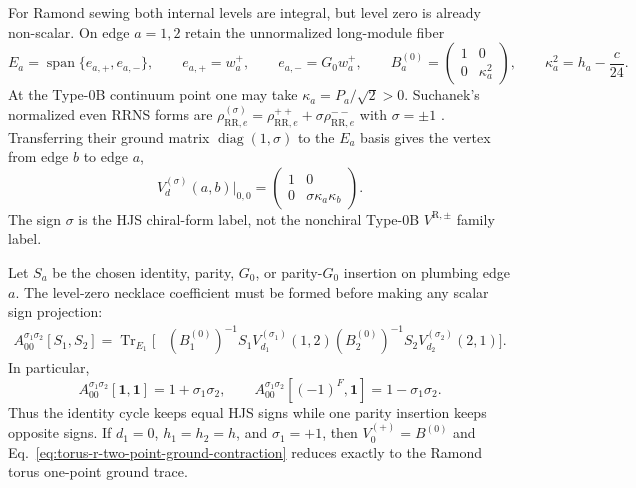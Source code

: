 \documentclass[11pt]{article}
\newcommand{\R}{\mathrm{R}}
\begin{document}
For Ramond sewing both internal levels are integral, but level zero is
already non-scalar.  On edge $a=1,2$ retain the unnormalized long-module
fiber
\[
 E_a=\operatorname{span}\{e_{a,+},e_{a,-}\},
 \qquad e_{a,+}=w_a^+,\qquad e_{a,-}=G_0w_a^+,
 \qquad
 B_a^{(0)}=
 \begin{pmatrix}1&0\\0&\kappa_a^2\end{pmatrix},
 \qquad
 \kappa_a^2=h_a-\frac{c}{24}.
\]
At the Type-0B continuum point one may take
$\kappa_a=P_a/\sqrt2>0$.  Suchanek's normalized even RRNS forms are
$\rho_{\R\R,e}^{(\sigma)}
=\rho_{\R\R,e}^{++}+\sigma\rho_{\R\R,e}^{--}$ with
$\sigma=\pm1$ \cite{Suchanek2011EllipticRecursion}.  Transferring their
ground matrix $\operatorname{diag}(1,\sigma)$ to the $E_a$ basis gives the
vertex from edge $b$ to edge $a$,
\begin{equation}
 V_{d}^{(\sigma)}(a,b)\big|_{0,0}
 =
 \begin{pmatrix}
  1&0\\[2pt]
  0&\sigma\kappa_a\kappa_b
 \end{pmatrix}.
 \label{eq:torus-r-two-point-ground-vertex}
\end{equation}
The sign $\sigma$ is the HJS chiral-form label, not the nonchiral Type-0B
$V^{\R,\pm}$ family label.

Let $S_a$ be the chosen identity, parity, $G_0$, or parity-$G_0$ insertion
on plumbing edge $a$.  The level-zero necklace coefficient must be formed
before making any scalar sign projection:
\begin{equation}
\begin{aligned}
 A_{00}^{\sigma_1\sigma_2}[S_1,S_2]
 =\operatorname{Tr}_{E_1}\!\Big[
 &(B_1^{(0)})^{-1}S_1V_{d_1}^{(\sigma_1)}(1,2)
 (B_2^{(0)})^{-1}S_2V_{d_2}^{(\sigma_2)}(2,1)
 \Big].
 \label{eq:torus-r-two-point-ground-contraction}
\end{aligned}
\end{equation}
In particular,
\begin{equation}
 A_{00}^{\sigma_1\sigma_2}[\mathbf1,\mathbf1]
 =1+\sigma_1\sigma_2,\qquad
 A_{00}^{\sigma_1\sigma_2}[(-1)^F,\mathbf1]
 =1-\sigma_1\sigma_2.
 \label{eq:torus-r-two-point-sign-selection}
\end{equation}
Thus the identity cycle keeps equal HJS signs while one parity insertion
keeps opposite signs.  If $d_1=0$, $h_1=h_2=h$, and $\sigma_1=+1$, then
$V_0^{(+)}=B^{(0)}$ and
Eq.~\eqref{eq:torus-r-two-point-ground-contraction} reduces exactly to the
Ramond torus one-point ground trace.
\end{document}
